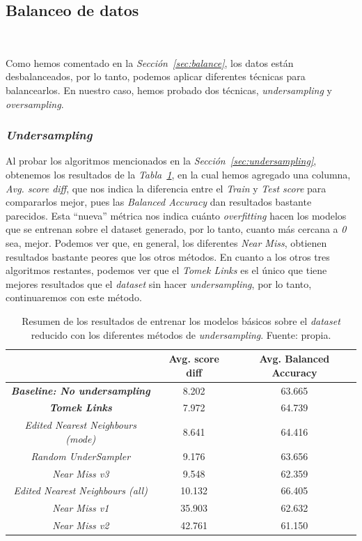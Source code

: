 \subsection{Balanceo de datos}\ \label{sec:i2-balance}

Como hemos comentado en la \textit{Sección\ \ref{sec:balance}}, los datos están desbalanceados, por lo tanto, podemos aplicar diferentes técnicas para balancearlos. En nuestro caso, hemos probado dos técnicas, \textit{undersampling} y \textit{oversampling}.

\subsubsection{\textit{Undersampling}}

Al probar los algoritmos mencionados en la \textit{Sección\ \ref{sec:undersampling}}, obtenemos los resultados de la \textit{Tabla\ \ref{tab:undersampling-methods}}, en la cual hemos agregado una columna, \textit{Avg. score diff}, que nos indica la diferencia entre el \textit{Train} y \textit{Test score} para compararlos mejor, pues las \textit{Balanced Accuracy} dan resultados bastante parecidos. Esta ``nueva'' métrica nos indica cuánto \textit{overfitting} hacen los modelos que se entrenan sobre el dataset generado, por lo tanto, cuanto más cercana a \textit{0} sea, mejor. Podemos ver que, en general, los diferentes \textit{Near Miss}, obtienen resultados bastante peores que los otros métodos. En cuanto a los otros tres algoritmos restantes, podemos ver que el \textit{Tomek Links} es el único que tiene mejores resultados que el \textit{dataset} sin hacer \textit{undersampling}, por lo tanto, continuaremos con este método.

\begin{table}[!h]
    \centering
    \begin{tabular}{|c|cc|} \hline
        & Avg. score diff & Avg. Balanced Accuracy \\ \hline
        \textit{\textbf{Baseline: No undersampling}} & 8.202 & 63.665 \\ 
        \textit{\textbf{Tomek Links}} & 7.972 & 64.739 \\ 
        \textit{Edited Nearest Neighbours (mode)} & 8.641 & 64.416 \\ 
        \textit{Random UnderSampler} & 9.176 & 63.656 \\ 
        \textit{Near Miss v3} & 9.548 & 62.359 \\ 
        \textit{Edited Nearest Neighbours (all)} & 10.132 & 66.405 \\ 
        \textit{Near Miss v1} & 35.903 & 62.632 \\ 
        \textit{Near Miss v2} & 42.761 & 61.150 \\ \hline
    \end{tabular}
    \caption{Resumen de los resultados de entrenar los modelos básicos sobre el \textit{dataset} reducido con los diferentes métodos de \textit{undersampling}. Fuente: propia.}\ \label{tab:undersampling-methods}
\end{table}

